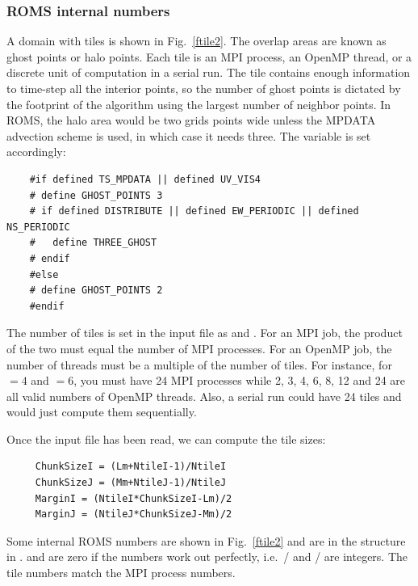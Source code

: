 \subsubsection{ROMS internal numbers}

A domain with tiles is shown in Fig.\ \ref{ftile2}. The overlap
areas are known as ghost points or halo points. Each tile is an
MPI process, an OpenMP thread, or a discrete unit of
computation in a serial run. The tile contains enough
information to time-step all the interior points, so the number
of ghost points is dictated by the footprint of the algorithm
using the largest number of neighbor points. In ROMS, the halo area
would be two grids points wide unless the MPDATA advection
scheme is used, in which case it needs three. The variable
 is set accordingly:
\begin{verbatim}
    #if defined TS_MPDATA || defined UV_VIS4
    # define GHOST_POINTS 3
    # if defined DISTRIBUTE || defined EW_PERIODIC || defined NS_PERIODIC
    #   define THREE_GHOST
    # endif
    #else
    # define GHOST_POINTS 2
    #endif
\end{verbatim}

The number of tiles is set in the input file as 
and . For an MPI job, the product of the two must
equal the number of MPI processes. For an OpenMP job, the
number of threads must be a multiple of the number of tiles.
For instance, for $=4$ and $=6$, you
must have 24 MPI processes while 2, 3, 4, 6, 8, 12 and 24 are all valid
numbers of OpenMP threads. Also, a serial run could have 24
tiles and would just compute them sequentially.

Once the input file
has been read, we can compute the tile sizes:
\begin{verbatim}
     ChunkSizeI = (Lm+NtileI-1)/NtileI
     ChunkSizeJ = (Mm+NtileJ-1)/NtileJ
     MarginI = (NtileI*ChunkSizeI-Lm)/2
     MarginJ = (NtileJ*ChunkSizeJ-Mm)/2
\end{verbatim}
Some internal ROMS numbers are shown in Fig.\ \ref{ftile2} and
are in the  structure in .
 and  are zero if the numbers work
out perfectly, i.e.\ / and
/ are integers. The tile numbers match
the MPI process numbers.

